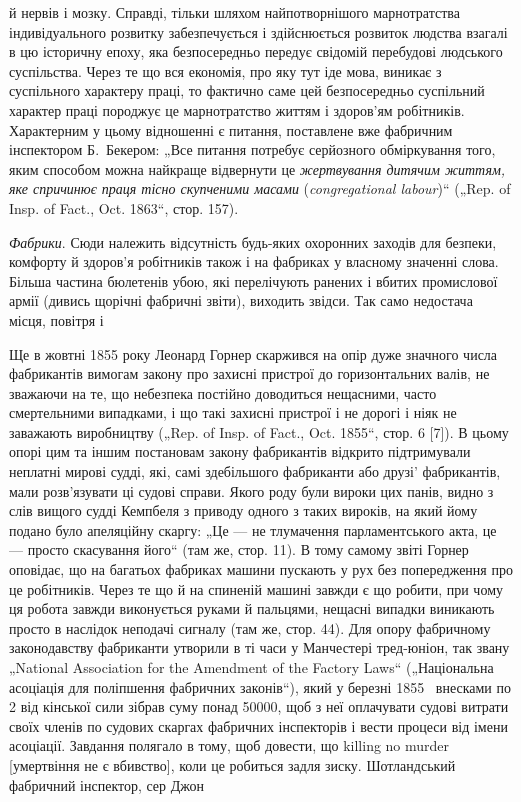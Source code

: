 \parcont{}  %
й нервів і мозку. Справді, тільки шляхом найпотворнішого марнотратства індивідуального розвитку
забезпечується і здійснюється
розвиток людства взагалі в цю історичну епоху, яка безпосередньо передує свідомій перебудові
людського суспільства. Через те що вся економія, про яку тут іде мова, виникає з суспільного
характеру праці, то фактично саме цей безпосередньо
суспільний характер праці породжує це марнотратство життям і
здоров’ям робітників. Характерним у цьому відношенні є питання,
поставлене вже фабричним інспектором Б.~Бекером: „Все питання потребує серйозного обміркування того,
яким способом
можна найкраще відвернути це \emph{жертвування дитячим життям,
яке спричинює праця тісно скупченими масами} (\emph{congregational
labour})“ („Rep. of Insp. of Fact., Oct. 1863“, стор. 157).

\emph{Фабрики}. Сюди належить відсутність будь-яких охоронних
заходів для безпеки, комфорту й здоров’я робітників також і на
фабриках у власному значенні слова. Більша частина бюлетенів
убою, які перелічують ранених і вбитих промислової армії (дивись щорічні фабричні звіти), виходить
звідси. Так само недостача місця, повітря і~

Ще в жовтні 1855 року Леонард Горнер скаржився на опір
дуже значного числа фабрикантів вимогам закону про захисні
пристрої до горизонтальних валів, не зважаючи на те, що небезпека постійно доводиться нещасними,
часто смертельними
випадками, і що такі захисні пристрої і не дорогі і ніяк не заважають виробництву („Rep. of Insp. of
Fact., Oct. 1855“, стор. 6 [7]).
В цьому опорі цим та іншим постановам закону фабрикантів
відкрито підтримували неплатні мирові судді, які, самі здебільшого фабриканти або друзі'
фабрикантів, мали розв’язувати ці судові справи. Якого роду були вироки цих панів,
видно з слів вищого судді Кемпбеля з приводу одного з таких
вироків, на який йому подано було апеляційну скаргу: „Це —
не тлумачення парламентського акта, це — просто скасування
його“ (там же, стор. 11). В тому самому звіті Горнер оповідає, що на багатьох фабриках машини
пускають у рух без
попередження про це робітників. Через те що й на спиненій
машині завжди є що робити, при чому ця робота завжди виконується руками й пальцями, нещасні випадки
виникають просто
в наслідок неподачі сигналу (там же, стор. 44). Для опору
фабричному законодавству фабриканти утворили в ті часи
у Манчестері тред-юніон, так звану „National Association for the
Amendment of the Factory Laws“ („Національна асоціація для поліпшення фабричних законів“), який у
березні 1855~ внесками
по 2 від кінської сили зібрав суму понад \num{50000}, щоб з неї оплачувати судові витрати своїх членів
по судових скаргах фабричних інспекторів і вести процеси від
імени асоціації. Завдання полягало в тому, щоб довести, що killing no murder [умертвіння не є
вбивство], коли це робиться
задля зиску. Шотландський фабричний інспектор, сер Джон
\parbreak{}  %
